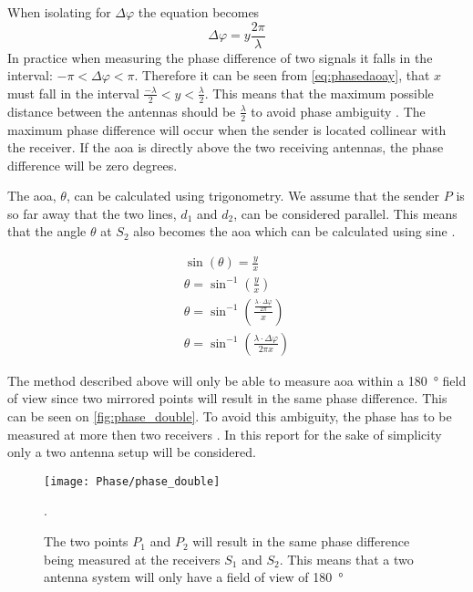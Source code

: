 When isolating for $\Delta\varphi$ the equation becomes
\begin{equation}
\Delta\varphi=y\frac{2\pi}{\lambda}
\end{equation}
In practice when measuring the phase difference of two signals it falls in the interval: $-\pi<\Delta\varphi<\pi$. Therefore it can be seen from \autoref{eq:phasedaoay}, that $x$ must fall in the interval $\frac{-\lambda}{2} < y < \frac{\lambda}{2}$. This means that the maximum possible distance between the antennas should be $\frac{\lambda}{2}$ to avoid phase ambiguity \citep{TechReport:DirectionFindingPaper,TechReport:Amundson2010}. The maximum phase difference will occur when the sender is located collinear with the receiver. If the \gls{aoa} is directly above the two receiving antennas, the phase difference will be zero degrees.

The \gls{aoa}, $\theta$, can be calculated using trigonometry. We assume that the sender $P$ is so far away that the two lines, $d_1$ and $d_2$, can be considered parallel.
This means that the angle $\theta$ at $S_2$ also becomes the \gls{aoa} which can be calculated using sine \citep{TechReport:DirectionFindingPaper}.

\begin{subequations}
	\begin{align}
	\sin(\theta) = \frac{y}{x} \\
	\theta = \sin^{-1}(\frac{y}{x}) \\
	\theta = \sin^{-1}(\frac{\frac{\lambda\cdot\Delta\varphi}{2\pi}}{x}) \\
	\theta = \sin^{-1}(\frac{\lambda\cdot\Delta\varphi}{2\pi x})
	\end{align}
\end{subequations}
\startexplain
{}
\stopexplain

The method described above will only be able to measure \gls{aoa} within a \SI{180}{\degree} field of view since two mirrored points will result in the same phase difference. 
This can be seen on \autoref{fig:phase_double}. To avoid this ambiguity, the phase has to be measured at more then two receivers \citep{TechReport:Amundson2010}. In this report for the sake of simplicity only a two antenna setup will be considered.

\begin{figure} [h]
\centering
\texttt{[image: Phase/phase\_double]}
\caption{The two points $P_1$ and $P_2$ will result in the same phase difference being measured at the receivers $S_1$ and $S_2$. This means that a two antenna system will only have a field of view of \SI{180}{\degree}}.
\label{fig:phase_double}
\end{figure}



